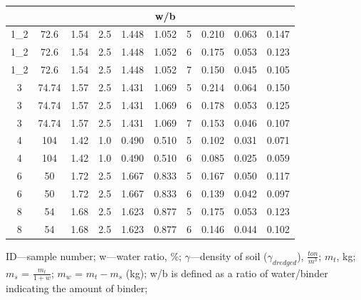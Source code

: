 \documentclass[sustainability,article,accept,pdftex,moreauthors]{Definitions/mdpi}
\begin{document}
{\begin{table}[H]
\begin{tabularx}{\textwidth}{CCCCCCCCCC}
{} & \boldmath{$\gamma$} &  &  &  & \textbf{w/b %
} &  &  &  \\
\_2 %
 & 72.6 & 1.54 & 2.5 & 1.448 & 1.052 & 5 & 0.210 & 0.063 & 0.147\\
1\_2 %
 & 72.6 & 1.54 & 2.5 & 1.448 & 1.052 & 6 & 0.175 & 0.053 & 0.123\\
1\_2 %
 & 72.6 & 1.54 & 2.5 & 1.448 & 1.052 & 7 & 0.150 & 0.045 & 0.105\\
3 & 74.74 & 1.57 & 2.5 & 1.431 & 1.069 & 5 & 0.214 & 0.064 & 0.150\\
3 & 74.74 & 1.57 & 2.5 & 1.431 & 1.069 & 6 & 0.178 & 0.053 & 0.125\\
3 & 74.74 & 1.57 & 2.5 & 1.431 & 1.069 & 7 & 0.153 & 0.046 & 0.107\\
4 & 104 & 1.42 & 1.0 & 0.490 & 0.510 & 5 & 0.102 & 0.031 & 0.071\\
4 & 104 & 1.42 & 1.0 & 0.490 & 0.510 & 6 & 0.085 & 0.025 & 0.059\\
6 & 50 & 1.72 & 2.5 & 1.667 & 0.833 & 5 & 0.167 & 0.050 & 0.117\\
6 & 50 & 1.72 & 2.5 & 1.667 & 0.833 & 6 & 0.139 & 0.042 & 0.097\\
8 & 54 & 1.68 & 2.5 & 1.623 & 0.877 & 5 & 0.175 & 0.053 & 0.123\\
8 & 54 & 1.68 & 2.5 & 1.623 & 0.877 & 6 & 0.146 & 0.044 & 0.102\\
\bottomrule
\end{tabularx}
\footnotesize{%
ID---sample number; %
 	 w---water ratio, \%; 
	 $\gamma$---density of soil ($\gamma_{dredged}$), $\frac{ton}{m^3}$; 
	 $m_t$, kg; 
	 $m_s$ = $\frac{m_t}{1+w}$; 
	 $m_w$ = $m_t - m_s$ (kg);
	 w/b is defined as a ratio of water/binder indicating the amount of binder;
}
\end{table}}
\end{document}
